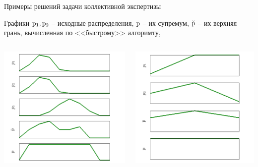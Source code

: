 \begin{frame}{Примеры решений задачи  коллективной экспертизы}
  \vspace{-2ex}
  \begin{center}
    Графики ${\mathrm{p}}_1, {\mathrm{p}}_2$ -- исходные распределения, ${\mathrm{p}}$ -- их супремум, $\check{{\mathrm{p}}}$ -- их верхняя грань, вычисленная по <<быстрому>> алгоримту, 
  \end{center} 
  \vspace{-3ex}
  \begin{columns}
	  \begin{center}
	      \includegraphics[width=0.9\linewidth]{./pic/prefsup102}
	  \end{center}
          \begin{center}
	      \includegraphics[width=1\linewidth]{./pic/prefsup6}
	  \end{center}
  \end{columns}
\end{frame} %

